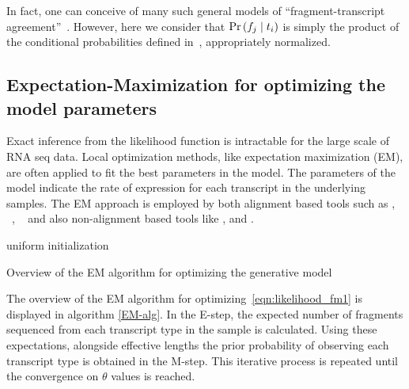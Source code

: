 In fact, one can conceive of many such general models of ``fragment-transcript
agreement''~\citep{Patro2017Salmon}. However, here we consider that 
$\Prob{f_j}{t_i}$ is simply the product of the conditional probabilities 
defined in~, appropriately 
normalized.


\subsection{Expectation-Maximization for optimizing the model parameters}
Exact inference from the likelihood function is intractable for the large 
scale of RNA seq data. Local optimization methods, like expectation 
maximization (EM), are often applied to fit the best parameters in the model. 
The parameters of the model indicate the rate of expression for each transcript 
in the underlying samples. The EM approach is employed by both alignment based 
tools such as \rsem \citep{Li2010RSEM}, \mmseq~\citep{Turro2011Haplotype}, 
\isoem~\citep{Nicolae2011Estimation} and also non-alignment based tools like 
\sailfish \citep{Patro2014Sailfish}, \salmon \citep{Patro2017Salmon} and 
\kallisto \citep{Bray2016Kallisto}. 

\begin{algorithm}[H]
\SetAlgoLined
{}
  uniform initialization\;
\caption{Overview of the EM algorithm for optimizing the generative model}
 \label{EM-alg}
\end{algorithm}

The overview of the EM algorithm for optimizing~\cref{eqn:likelihood_fm1} is 
displayed in algorithm \ref{EM-alg}. In the E-step, the expected number of 
fragments sequenced from each transcript type in the sample is calculated. 
Using these expectations, alongside effective lengths the prior probability of 
observing each transcript type is obtained in the M-step. This iterative process 
is repeated until the convergence on $\theta$ values is reached. 

